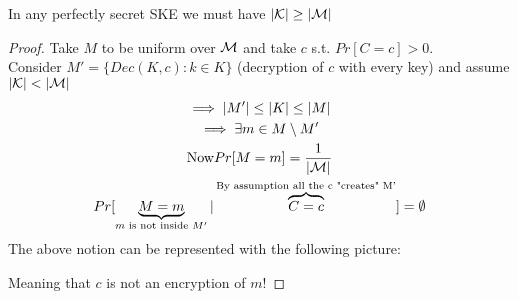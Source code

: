 \begin{theorem}
    In any perfectly secret SKE we must have $|\mathcal{K}|\geq |\mathcal{M}|$
\end{theorem}
\begin{proof}
    Take $M$ to be uniform over $\mathcal{M}$ and take $c$ s.t. $Pr[C=c]>0$.\\
    Consider $M'=\{Dec(K,c):k\in K\}$ (decryption of $c$ with every key) and assume $|\K|<|\M|$
    \begin{gather*}
        \implies |M'|\leq |K|\leq |M|\\
        \implies \exists m \in M \setminus M'\\
        \text{Now} Pr[M=m]=\frac{1}{|\mathcal{M}|}\\
        Pr[\underbrace{M=m}_{m\text{ is not inside }M'}|\overbrace{C=c}^{\text{By assumption all the c "creates" M'}}]=\emptyset
    \end{gather*}
    The above notion can be represented with the following picture:\\
    \def\firstcircle{(0,0) circle (1.5cm)}
    \def\secondcircle{(60:0) circle (0.9cm)}
    Meaning that $c$ is not an encryption of $m$!
\end{proof}